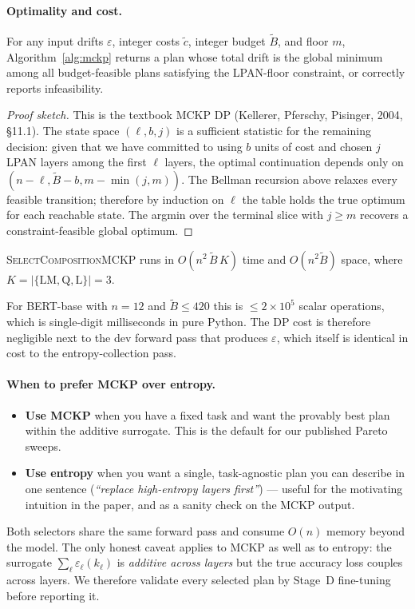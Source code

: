 \documentclass[11pt,a4paper]{article}
\begin{document}
\paragraph{Optimality and cost.}
\begin{theorem}
\label{thm:mckp-opt}
For any input drifts $\varepsilon$, integer costs $\tilde c$, integer
budget $\tilde B$, and floor $m$, Algorithm~\ref{alg:mckp} returns
a plan whose total drift is the global minimum among all
budget-feasible plans satisfying the LPAN-floor constraint, or
correctly reports infeasibility.
\end{theorem}
\begin{proof}[Proof sketch]
This is the textbook MCKP DP (Kellerer, Pferschy, Pisinger, 2004,
\S11.1). The state space $(\ell, b, j)$ is a sufficient statistic for
the remaining decision: given that we have committed to using $b$
units of cost and chosen $j$ LPAN layers among the first $\ell$
layers, the optimal continuation depends only on
$(n-\ell, \tilde B - b, m - \min(j, m))$. The Bellman recursion
above relaxes every feasible transition; therefore by induction on
$\ell$ the table holds the true optimum for each reachable state.
The argmin over the terminal slice with $j\ge m$ recovers a
constraint-feasible global optimum.
\end{proof}

\begin{theorem}[Cost]
\label{thm:mckp-time}
\textsc{SelectCompositionMCKP} runs in $O(n^2 \,\tilde B \, K)$ time
and $O(n^2 \tilde B)$ space, where $K=|\{\mathrm{LM},\mathrm{Q},\mathrm{L}\}|=3$.
\end{theorem}

For BERT-base with $n=12$ and $\tilde B \le 420$ this is
${\le}2\!\times\!10^5$ scalar operations, which is single-digit
milliseconds in pure Python. The DP cost is therefore negligible
next to the dev forward pass that produces $\varepsilon$, which itself
is identical in cost to the entropy-collection pass.

\paragraph{When to prefer MCKP over entropy.}
\begin{itemize}
  \item \textbf{Use MCKP} when you have a fixed task and want the
    provably best plan within the additive surrogate. This is the
    default for our published Pareto sweeps.
  \item \textbf{Use entropy} when you want a single, task-agnostic
    plan you can describe in one sentence (\emph{``replace high-entropy
    layers first''}) — useful for the motivating intuition in the
    paper, and as a sanity check on the MCKP output.
\end{itemize}
Both selectors share the same forward pass and consume $O(n)$ memory
beyond the model. The only honest caveat applies to MCKP as well as
to entropy: the surrogate $\sum_\ell \varepsilon_\ell(k_\ell)$ is
\emph{additive across layers} but the true accuracy loss couples
across layers. We therefore validate every selected plan by Stage~D
fine-tuning before reporting it.
\end{document}
